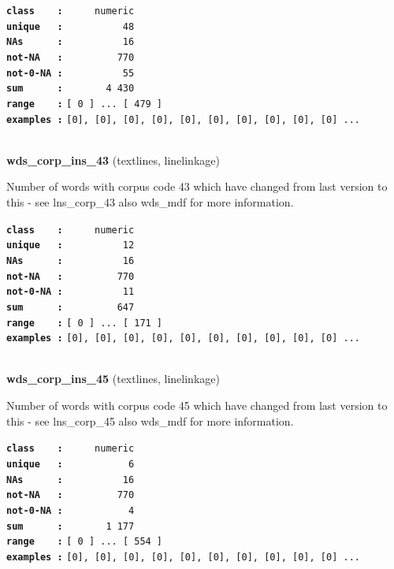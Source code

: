 \documentclass[]{article}
\begin{document}
\textbf{\texttt{class\ \ \ \ :}} \texttt{~~~~~numeric}\\
\textbf{\texttt{unique\ \ \ :}} \texttt{~~~~~~~~~~48}\\
\textbf{\texttt{NAs\ \ \ \ \ \ :}} \texttt{~~~~~~~~~~16}\\
\textbf{\texttt{not-NA\ \ \ :}} \texttt{~~~~~~~~~770}\\
\textbf{\texttt{not-0-NA\ :}} \texttt{~~~~~~~~~~55}\\
\textbf{\texttt{sum\ \ \ \ \ \ :}} \texttt{~~~~~~~4~430}\\
\textbf{\texttt{range\ \ \ \ :}}
\texttt{{[}\ 0\ {]}\ ...\ {[}\ 479\ {]}}\\
\textbf{\texttt{examples\ :}}
\texttt{{[}0{]},\ {[}0{]},\ {[}0{]},\ {[}0{]},\ {[}0{]},\ {[}0{]},\ {[}0{]},\ {[}0{]},\ {[}0{]},\ {[}0{]}\ ...}\\

~

\textbf{wds\_corp\_ins\_43} (textlines, linelinkage)

Number of words with corpus code 43 which have changed from last version
to this - see lns\_corp\_43 also wds\_mdf for more information.

\textbf{\texttt{class\ \ \ \ :}} \texttt{~~~~~numeric}\\
\textbf{\texttt{unique\ \ \ :}} \texttt{~~~~~~~~~~12}\\
\textbf{\texttt{NAs\ \ \ \ \ \ :}} \texttt{~~~~~~~~~~16}\\
\textbf{\texttt{not-NA\ \ \ :}} \texttt{~~~~~~~~~770}\\
\textbf{\texttt{not-0-NA\ :}} \texttt{~~~~~~~~~~11}\\
\textbf{\texttt{sum\ \ \ \ \ \ :}} \texttt{~~~~~~~~~647}\\
\textbf{\texttt{range\ \ \ \ :}}
\texttt{{[}\ 0\ {]}\ ...\ {[}\ 171\ {]}}\\
\textbf{\texttt{examples\ :}}
\texttt{{[}0{]},\ {[}0{]},\ {[}0{]},\ {[}0{]},\ {[}0{]},\ {[}0{]},\ {[}0{]},\ {[}0{]},\ {[}0{]},\ {[}0{]}\ ...}\\

~

\textbf{wds\_corp\_ins\_45} (textlines, linelinkage)

Number of words with corpus code 45 which have changed from last version
to this - see lns\_corp\_45 also wds\_mdf for more information.

\textbf{\texttt{class\ \ \ \ :}} \texttt{~~~~~numeric}\\
\textbf{\texttt{unique\ \ \ :}} \texttt{~~~~~~~~~~~6}\\
\textbf{\texttt{NAs\ \ \ \ \ \ :}} \texttt{~~~~~~~~~~16}\\
\textbf{\texttt{not-NA\ \ \ :}} \texttt{~~~~~~~~~770}\\
\textbf{\texttt{not-0-NA\ :}} \texttt{~~~~~~~~~~~4}\\
\textbf{\texttt{sum\ \ \ \ \ \ :}} \texttt{~~~~~~~1~177}\\
\textbf{\texttt{range\ \ \ \ :}}
\texttt{{[}\ 0\ {]}\ ...\ {[}\ 554\ {]}}\\
\textbf{\texttt{examples\ :}}
\texttt{{[}0{]},\ {[}0{]},\ {[}0{]},\ {[}0{]},\ {[}0{]},\ {[}0{]},\ {[}0{]},\ {[}0{]},\ {[}0{]},\ {[}0{]}\ ...}\\
\end{document}
